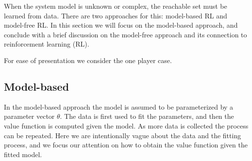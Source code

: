 
When the system model is unknown or complex, the reachable set must be learned from data. There are two approaches for this: model-based RL and model-free RL. In this section we will focus on the model-based approach, and conclude with a brief discussion on the model-free approach and its connection to reinforcement learning (RL).

For ease of presentation we consider the one player case.

\subsection{Model-based}

In the model-based approach the model is assumed to be parameterized by a parameter vector $\theta$. %
%
The data is first used to fit the parameters, and then the value function is computed given the model. As more data is collected the process can be repeated. Here we are intentionally vague about the data and the fitting process, and we focus our attention on how to obtain the value function given the fitted model.

